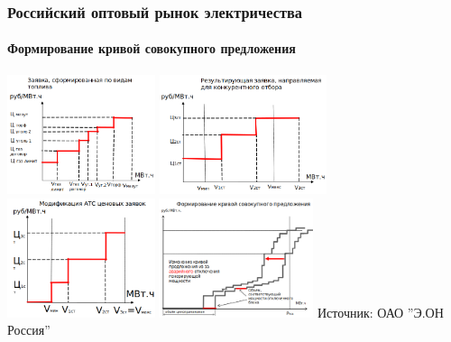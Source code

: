 \documentclass[c, dvipsnames]{beamer}  %
\begin{document}
\begin{frame}[shrink=5]
\frametitle{Российский оптовый рынок электричества} 
\framesubtitle{Формирование кривой совокупного предложения }
\vfil
\hfil\hfil\includegraphics[height=3.5cm]{screenshot030}\hfil\hfil
\includegraphics[height=3.5cm]{screenshot031}
\newline
\vfil
\hfil\hfil\includegraphics[height=3.5cm]{screenshot027}\hfil\hfil
\includegraphics[height=3.5cm]{screenshot029}
\newline
\footnotesize{Источник:  ОАО ''Э.ОН Россия'' }

\end{frame}
\end{document}
